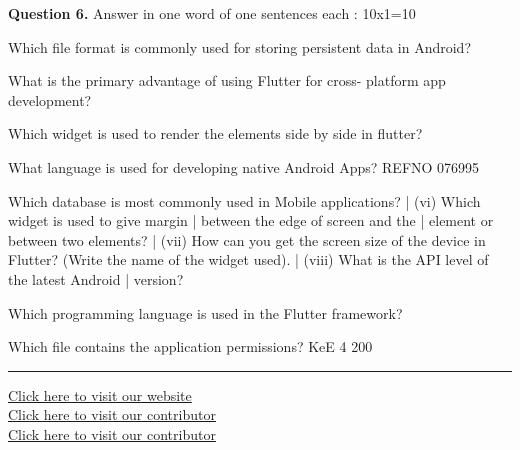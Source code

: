\documentclass[11pt,a4paper]{article}
\begin{document}
\medskip\noindent\textbf{Question 6.} Answer in one word of one sentences each :
10x1=10
\begin{parts}
  \item Which file format is commonly used for
  storing persistent data in Android?
  \begin{parts}
    \item What is the primary advantage of using
    Flutter for cross- platform app
    development?
    \item Which widget is used to render the
    elements side by side in flutter?
    \item What language is used for developing
    native Android Apps?
    REFNO 076995
    \item Which database is most commonly used
    in Mobile applications?
    | (vi) Which widget is used to give margin
    | between the edge of screen and the
    | element or between two elements?
    | (vii) How can you get the screen size of the
    device in Flutter? (Write the name of the
    widget used).
    | (viii) What is the API level of the latest Android
    | version?
    \item Which programming language is used in
    the Flutter framework?
    \item Which file contains the application
    permissions?
    KeE
    4 200
  \end{parts}
\end{parts}

\vfill
\rule{\linewidth}{0.4pt}
\begin{center}\small
\href{https://bhu-exam.vercel.app/}{Click here to visit our website}\\[4pt]\href{https://me-aryan.vercel.app/}{Click here to visit our contributor}\\[4pt]\href{https://quashan-me.vercel.app/}{Click here to visit our contributor}
\end{center}
\end{document}
